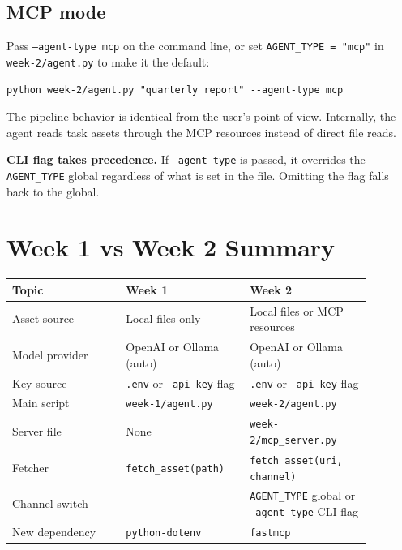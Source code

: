 \documentclass[12pt, a4paper]{article}
\begin{document}
\subsection{MCP mode}

Pass \texttt{--agent-type mcp} on the command line, or set \texttt{AGENT\_TYPE = "mcp"} in \texttt{week-2/agent.py} to make it the default:

\begin{lstlisting}[style=shellstyle]
python week-2/agent.py "quarterly report" --agent-type mcp
\end{lstlisting}

The pipeline behavior is identical from the user's point of view. Internally, the agent reads task assets through the MCP resources instead of direct file reads.

\begin{notebox}
\textbf{CLI flag takes precedence.} If \texttt{--agent-type} is passed, it overrides the \texttt{AGENT\_TYPE} global regardless of what is set in the file. Omitting the flag falls back to the global.
\end{notebox}


\section{Week 1 vs Week 2 Summary}

\begin{center}
\begin{tabular}{p{0.28\linewidth}p{0.30\linewidth}p{0.30\linewidth}}
\textbf{Topic} & \textbf{Week 1} & \textbf{Week 2} \\
\hline
Asset source & Local files only & Local files or MCP resources \\
Model provider & OpenAI or Ollama (auto) & OpenAI or Ollama (auto) \\
Key source & \texttt{.env} or \texttt{--api-key} flag & \texttt{.env} or \texttt{--api-key} flag \\
Main script & \texttt{week-1/agent.py} & \texttt{week-2/agent.py} \\
Server file & None & \texttt{week-2/mcp\_server.py} \\
Fetcher & \texttt{fetch\_asset(path)} & \texttt{fetch\_asset(uri, channel)} \\
Channel switch & -- & \texttt{AGENT\_TYPE} global or \texttt{--agent-type} CLI flag \\
New dependency & \texttt{python-dotenv} & \texttt{fastmcp} \\
\end{tabular}
\end{center}
\end{document}
